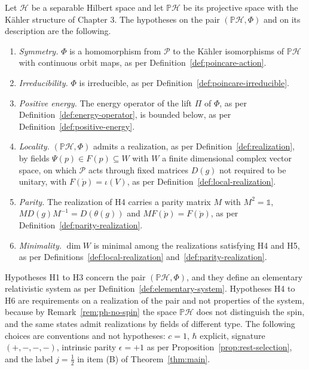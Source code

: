 \begin{definition}\label{def:hypotheses}
	Let $\mathcal{H}$ be a separable Hilbert space and let $\mathbb{P}\mathcal{H}$ be its projective space with the Kähler structure of Chapter 3. The hypotheses on the pair $(\mathbb{P}\mathcal{H},\Phi)$ and on its description are the following.
	\begin{enumerate}
		\item[\textbf{H1}] \emph{Symmetry.} $\Phi$ is a homomorphism from $\mathcal{P}$ to the Kähler isomorphisms of $\mathbb{P}\mathcal{H}$ with continuous orbit maps, as per Definition~\ref{def:poincare-action}.
		\item[\textbf{H2}] \emph{Irreducibility.} $\Phi$ is irreducible, as per Definition~\ref{def:poincare-irreducible}.
		\item[\textbf{H3}] \emph{Positive energy.} The energy operator of the lift $\Pi$ of $\Phi$, as per Definition~\ref{def:energy-operator}, is bounded below, as per Definition~\ref{def:positive-energy}.
		\item[\textbf{H4}] \emph{Locality.} $(\mathbb{P}\mathcal{H},\Phi)$ admits a realization, as per Definition~\ref{def:realization}, by fields $\Psi(p)\in F(p)\subseteq W$ with $W$ a finite dimensional complex vector space, on which $\mathcal{P}$ acts through fixed matrices $D(g)$ not required to be unitary, with $F(\mathring{p})=\iota(V)$, as per Definition~\ref{def:local-realization}.
		\item[\textbf{H5}] \emph{Parity.} The realization of H4 carries a parity matrix $M$ with $M^2=\mathbb{1}$, $M D(g)M^{-1}=D(\theta(g))$ and $MF(\mathring{p})=F(\mathring{p})$, as per Definition~\ref{def:parity-realization}.
		\item[\textbf{H6}] \emph{Minimality.} $\dim W$ is minimal among the realizations satisfying H4 and H5, as per Definitions~\ref{def:local-realization} and~\ref{def:parity-realization}.
	\end{enumerate}
\end{definition}

\begin{remark}\label{rem:hypotheses-nature}
	Hypotheses H1 to H3 concern the pair $(\mathbb{P}\mathcal{H},\Phi)$, and they define an elementary relativistic system as per Definition~\ref{def:elementary-system}. Hypotheses H4 to H6 are requirements on a realization of the pair and not properties of the system, because by Remark~\ref{rem:ph-no-spin} the space $\mathbb{P}\mathcal{H}$ does not distinguish the spin, and the same states admit realizations by fields of different type. The following choices are conventions and not hypotheses: $c=1$, $\hbar$ explicit, signature $(+,-,-,-)$, intrinsic parity $\epsilon=+1$ as per Proposition~\ref{prop:rest-selection}, and the label $j=\tfrac12$ in item (B) of Theorem~\ref{thm:main}.
\end{remark}

